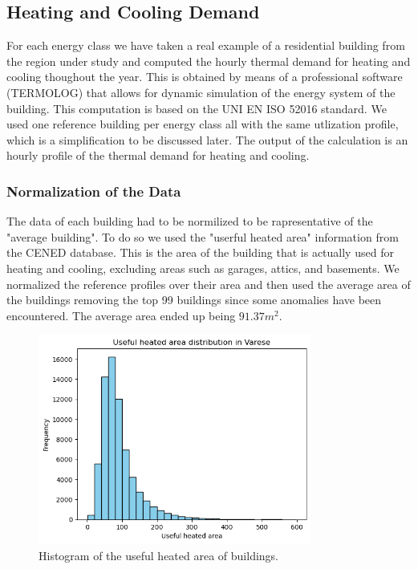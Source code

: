 \subsection{Heating and Cooling Demand}
For each energy class we have taken a real example of a residential building from the region under study and computed the 
hourly thermal demand for heating and cooling thoughout the year.
This is obtained by means of a professional software (TERMOLOG) that allows for dynamic simulation of the energy system of the building.
This computation is based on the UNI EN ISO 52016 standard.
We used one reference building per energy class all with the same utlization profile, which is a simplification to be discussed later.
The output of the calculation is an hourly profile of the thermal demand for heating and cooling.


\subsubsection{Normalization of the Data}
The data of each building had to be normilized to be rapresentative of the "average building".
To do so we used the "userful heated area" information from the CENED database.
This is the area of the building that is actually used for heating and cooling, excluding areas such as garages, attics, and basements.
We normalized the reference profiles over their area and then used the average area 
of the buildings removing the top 99 buildings since some anomalies have been encountered.
The average area ended up being $91.37 m^2$.

\begin{figure}[H]
    \centering
    \includegraphics[width=0.8\textwidth]{figures/1_building_area_histogram.png}
    \caption{Histogram of the useful heated area of buildings.}
    \label{fig:building_area_histogram}
\end{figure}

